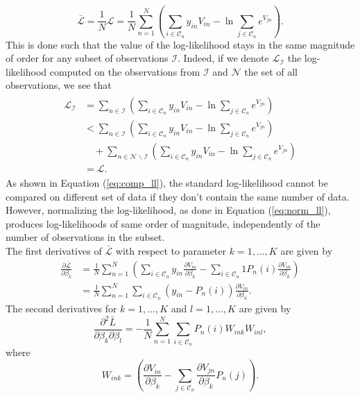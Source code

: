 \documentclass[conference]{IEEEtran}
\begin{document}
\begin{equation}
\label{eq:norm_ll}
\bar{\mathcal{L}} = \frac{1}{N}\mathcal{L} = \frac{1}{N} \sum_{n=1}^N \left( \sum_{i\in\mathcal{C}_n} y_{in}V_{in} - \ln \sum_{j\in\mathcal{C}_n}e^{V_{jn}} \right).
\end{equation}
This is done such that the value of the log-likelihood stays in the same magnitude of order for any subset of observations $\mathcal{I}$. Indeed, if we denote $\mathcal{L}_{\mathcal{I}}$ the log-likelihood computed on the observations from $\mathcal{I}$ and $\mathcal{N}$ the set of all observations, we see that
\begin{align}
\label{eq:comp_ll}
\begin{split}
\mathcal{L}_{\mathcal{I}} &=  \sum_{n\in \mathcal{I}} \left( \sum_{i\in\mathcal{C}_n} y_{in}V_{in} - \ln \sum_{j\in\mathcal{C}_n}e^{V_{jn}} \right)  \\
&< \sum_{n\in \mathcal{I}} \left( \sum_{i\in\mathcal{C}_n} y_{in}V_{in} - \ln \sum_{j\in\mathcal{C}_n}e^{V_{jn}} \right) \\ &\quad + \sum_{n \in \mathcal{N} \smallsetminus \mathcal{I}} \left( \sum_{i\in\mathcal{C}_n} y_{in}V_{in} - \ln \sum_{j\in\mathcal{C}_n}e^{V_{jn}} \right) \\
&= \mathcal{L}.
\end{split}
\end{align}
As shown in Equation (\ref{eq:comp_ll}), the standard log-likelihood cannot be compared on different set of data if they don't contain the same number of data. However, normalizing the log-likelihood, as done in Equation (\ref{eq:norm_ll}), produces log-likelihoods of same order of magnitude, independently of the number of observations in the subset.\\

The first derivatives of $\bar{\mathcal{L}}$ with respect to parameter $k=1,\ldots,K$ are given by
\begin{align}
\frac{\partial \bar{\mathcal{L}}}{\partial \beta_k} &= \frac{1}{N} \sum_{n=1}^N \left(\sum_{i\in\mathcal{C}_n} y_{in}\frac{\partial V_{in}}{\partial \beta_k} - \sum_{i\in\mathcal{C}_n}1 P_n(i) \frac{\partial V_{in}}{\partial \beta_k}\right) \nonumber \\
&= \frac{1}{N}\sum_{n=1}^N \sum_{i\in\mathcal{C}_n} \left(y_{in} - P_n(i)\right) \frac{\partial V_{in}}{\partial \beta_k}. 
\end{align}
The second derivatives for $k=1,\ldots,K$ and $l=1,\ldots,K$ are given by
\begin{equation}
\label{eq:second_deriv}
\frac{\partial^2 \bar{L}}{\partial \beta_k \partial \beta_l} = - \frac{1}{N}\sum_{n=1}^N \sum_{i\in\mathcal{C}_n} P_n(i) W_{ink} W_{inl},
\end{equation}
where 
\[
W_{ink} = \left(\frac{\partial V_{in}}{\partial \beta_k} - \sum_{j\in\mathcal{C}_n} \frac{\partial V_{jn}}{\partial \beta_k}P_n(j)\right).
\]
\end{document}
